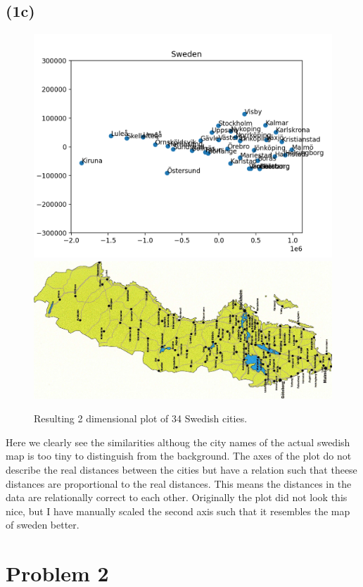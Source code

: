\documentclass[12pt, letterpaper]{article}
\begin{document}
    \subsection*{(1c)}
      \begin{figure}[H]
        \caption{Resulting 2 dimensional plot of 34 Swedish cities.}
        \centering
        \includegraphics[scale=0.7]{Swedishcities}
        \includegraphics[scale=0.1]{Swedishmap}
      \end{figure}
      Here we clearly see the similarities althoug the city names of the actual swedish map is too tiny to distinguish from the background. The axes of the plot do not describe the real distances between the cities but have a relation such that theese distances are proportional to the real distances. This means the distances in the data are relationally correct to each other.
      Originally the plot did not look this nice, but I have manually scaled the second axis such that it resembles the map of sweden better.\\
  \section*{Problem 2}
\end{document}
